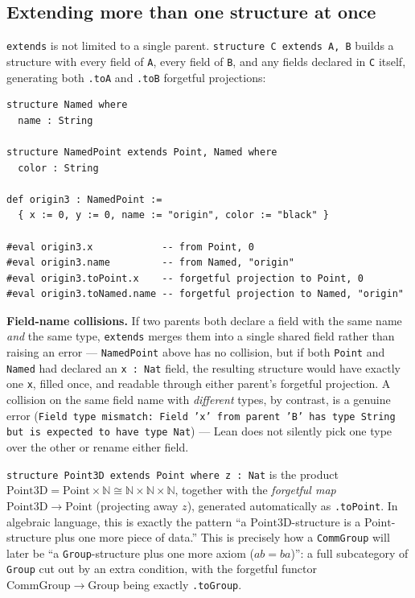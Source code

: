 \subsection{Extending more than one structure at once}\label{sec:02-functions-and-structures:03-extending-structures:3}

\texttt{extends} is not limited to a single parent. \texttt{structure C extends A, B} builds a structure with every field of \texttt{A}, every field of \texttt{B}, and any fields declared in \texttt{C} itself, generating both \texttt{.toA} and \texttt{.toB} forgetful projections:

\begin{lstlisting}
structure Named where
  name : String

structure NamedPoint extends Point, Named where
  color : String

def origin3 : NamedPoint :=
  { x := 0, y := 0, name := "origin", color := "black" }

#eval origin3.x            -- from Point, 0
#eval origin3.name         -- from Named, "origin"
#eval origin3.toPoint.x    -- forgetful projection to Point, 0
#eval origin3.toNamed.name -- forgetful projection to Named, "origin"
\end{lstlisting}

\textbf{Field-name collisions.} If two parents both declare a field with the same name \emph{and} the same type, \texttt{extends} merges them into a single shared field rather than raising an error --- \texttt{NamedPoint} above has no collision, but if both \texttt{Point} and \texttt{Named} had declared an \texttt{x : Nat} field, the resulting structure would have exactly one \texttt{x}, filled once, and readable through either parent's forgetful projection. A collision on the same field name with \emph{different} types, by contrast, is a genuine error (\texttt{Field type mismatch: Field 'x' from parent 'B' has type String but is expected to have type Nat}) --- Lean does not silently pick one type over the other or rename either field.

\begin{mathreading}

\texttt{structure Point3D extends Point where z : Nat} is the product \(\mathrm{Point3D} = \mathrm{Point} \times \mathbb{N} \cong
\mathbb{N} \times \mathbb{N} \times \mathbb{N}\), together with the \emph{forgetful map} \(\mathrm{Point3D} \to \mathrm{Point}\) (projecting away \(z\)), generated automatically as \texttt{.toPoint}. In algebraic language, this is exactly the pattern ``a \(\mathrm{Point3D}\)-structure is a \(\mathrm{Point}\)-structure plus one more piece of data.'' This is precisely how a \texttt{CommGroup} will later be ``a \texttt{Group}-structure plus one more axiom (\(ab = ba\))'': a full subcategory of \texttt{Group} cut out by an extra condition, with the forgetful functor \(\mathrm{CommGroup} \to \mathrm{Group}\) being exactly \texttt{.toGroup}.

\end{mathreading}

